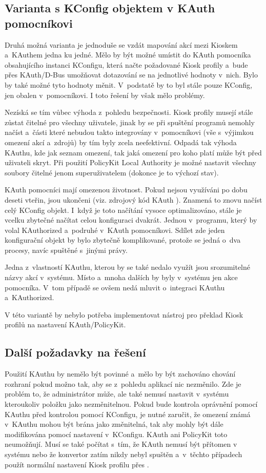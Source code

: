 \subsection*{Varianta s KConfig objektem v KAuth pomocníkovi}
Druhá možná varianta je jednoduše se vzdát mapování akcí mezi Kioskem a~KAuthem jedna ku jedné. Mělo by být možné umístit do KAuth pomocníka obsahujícího instanci KConfigu, která načte požadované Kiosk profily a~bude přes KAuth/D-Bus umožňovat dotazování se na jednotlivé hodnoty v~nich. Bylo by také možné tyto hodnoty měnit. V~podstatě by to byl stále pouze KConfig, jen obalen v~pomocníkovi. I toto řešení by však mělo problémy.

Nezíská se tím vůbec výhoda z~pohledu bezpečnosti. Kiosk profily musejí stále zůstat čitelné pro všechny uživatele, jinak by se při spuštění programů nemohly načíst a~části které nebudou takto integrovány v~pomocníkovi (vše s~výjimkou omezení akcí a~zdrojů) by tím byly zcela neefektivní. Odpadá tak výhoda KAuthu, kde jak seznam omezení, tak jaká omezení pro koho platí může být před uživateli skryt. Při použití PolicyKit Local Authority je možné nastavit všechny soubory čitelné jenom superuživatelem (dokonce je to výchozí stav).

KAuth pomocníci mají omezenou životnost. Pokud nejsou využíváni po dobu deseti vteřin, jsou ukončeni (viz. zdrojový kód KAuth \cite{codeKAuth}). Znamená to znovu načíst celý KConfig objekt. I~když je toto načítání vysoce optimalizováno, stále je vcelku zbytečné načítat celou konfiguraci dvakrát. Jednou v~programu, který by volal KAuthorized a~podruhé v~KAuth pomocníkovi. Sdílet zde jeden konfigurační objekt by bylo zbytečně komplikované, protože se jedná o~dva procesy, navíc spuštěné s~jinými právy.

Jedna z~vlastností KAuthu, kterou by se také nedalo využít jsou srozumitelné názvy akcí v~systému. Místo  a~mnoha dalších by byly v~systému jen akce pomocníka. V~tom případě se ovšem nedá mluvit o~integraci KAuthu a~KAuthorized.

V této variantě by nebylo potřeba implementovat nástroj pro překlad Kiosk profilů na nastavení KAuth/PolicyKit.

\subsection*{Další požadavky na řešení}
Použití KAuthu by nemělo být povinné a~mělo by být zachováno chování rozhraní  pokud možno tak, aby se z~pohledu aplikací nic nezměnilo. Zde je problém to, že administrátor může, ale také nemusí nastavit v~systému  kteroukoliv položku jako nezměnitelnou. Pokud bude kontrola oprávnění pomocí KAuthu před kontrolou pomocí KConfigu, je nutné zaručit, že omezení známá v~KAuthu mohou být brána jako změnitelná, tak aby mohly být dále modifikována pomocí nastavení v~KConfigu. KAuth ani PolicyKit toto neumožňují. Musí se také počítat s~tím, že KAuth nemusí být přítomen v systému nebo že konvertor zatím nikdy nebyl spuštěn a~v~těchto případech použít normální nastavení Kiosk profilu přes .

